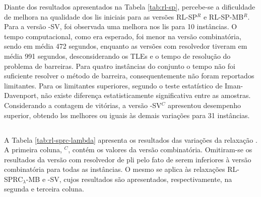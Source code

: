 Diante  dos  resultados apresentados  na  Tabela  \ref{tab:rl-sp}, percebe-se  a
dificuldade  de melhora  na qualidade  dos  \gls{li}s iniciais  para as  versões
RL-SP$^{R}$ e RL-SP-MB$^{R}$. Para a versão {\rlu}-SV, foi observada uma melhora
nos \gls{li}s para 10 instâncias. O  tempo computacional, como era esperado, foi
menor na versão  combinatória, sendo em média 472 segundos,  enquanto as versões
com resolvedor tiveram em média 991  segundos, desconsiderando os TLEs e o tempo
de resolução  do problema  de barreiras.  Para quatro  instâncias do  conjunto o
tempo não  foi suficiente  resolver o método  de barreira,  consequentemente não
foram  reportados limitantes.  Para os  limitantes superiores,  segundo o  teste
estatístico   de   Iman-Davenport,   não   existe   diferença   estatisticamente
significativa entre as  amostras. Considerando a contagem de  vitórias, a versão
{\rlu}-SV$^C$  apresentou desempenho  superior,  obtendo  \gls{ls}s melhores  ou
iguais às demais variações para 31 instâncias.
\newpage

\subsection{\rld}

A  Tabela  \ref{tab:rl-sprc-lambda} apresenta  os  resultados  das variações  da
relaxação {\rld}.  A primeira  coluna, {\rld}$^C$, contém  os valores  da versão
combinatória. Omitiram-se  os resultados da  versão com resolvedor  de \gls{pli}
pelo fato de serem inferiores à  versão combinatória para todas as instâncias. O
mesmo  se  aplica  às   relaxações  RL-SPRC$_{\lambda}$-MB  e  {\rld}-SV,  cujos
resultados são apresentados, respectivamente, na segunda e terceira coluna.

